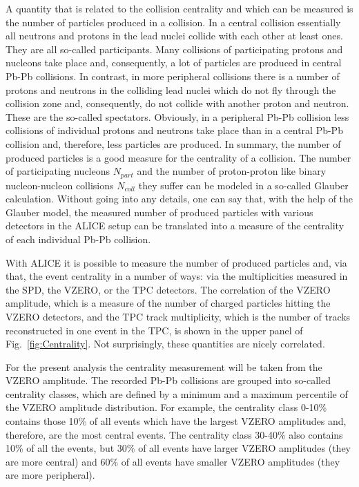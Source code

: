 \documentclass{article}
\begin{document}
A quantity that is related to the collision centrality and which can be
measured is the number of particles produced in a collision. In a central
collision essentially all neutrons and protons in the lead nuclei collide
with each other at least ones. They are all so-called participants. Many
collisions of participating protons and nucleons take place and, consequently,
a lot of particles are produced in central Pb-Pb collisions. In contrast,
in more peripheral collisions there is a number of protons and neutrons in 
the colliding lead nuclei which do not fly through the collision zone and,
consequently, do not collide with another proton and neutron. These are the
so-called spectators. Obviously, in a peripheral Pb-Pb collision less
collisions of individual protons and neutrons take place than in a central
Pb-Pb collision and, therefore, less particles are produced. In summary,
the number of produced particles is a good measure for the centrality of a 
collision. The number of participating nucleons $N_{part}$ and the number
of proton-proton like binary nucleon-nucleon collisions $N_{coll}$ they suffer
can be modeled in a so-called Glauber calculation. Without going into any
details, one can say that, with the help of the Glauber model, the measured
number of produced particles with various detectors in the ALICE setup can
be translated into a measure of the centrality of each individual Pb-Pb
collision.

With ALICE it is possible to measure the number of produced particles and, 
via that, the event centrality in a number of ways: via the multiplicities 
measured in the SPD, the VZERO, or the TPC detectors. The correlation of the 
VZERO amplitude, which is a measure of the number of charged particles hitting
the VZERO detectors, and the TPC track multiplicity, which is the number
of tracks reconstructed in one event in the TPC, is shown in the upper panel
of Fig.~\ref{fig:Centrality}. Not surprisingly, these quantities are
nicely correlated.

For the present analysis the centrality measurement will be taken from the
VZERO amplitude. The recorded Pb-Pb collisions are grouped into so-called
centrality classes, which are defined by a minimum and a maximum percentile
of the VZERO amplitude distribution. For example, the centrality class
0-10\% contains those 10\% of all events which have the largest 
VZERO amplitudes and, therefore, are the most central events.
The centrality class 30-40\% also contains 10\% of all the events, but 
30\% of all events have larger VZERO amplitudes (they are more central)
and 60\% of all events have smaller VZERO amplitudes (they are more 
peripheral). 
\end{document}
